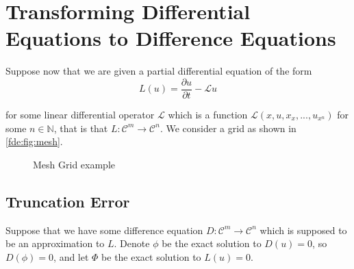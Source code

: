 \documentclass[../main.tex]{subfiles}
\begin{document}
  \section{Transforming Differential Equations to Difference Equations}
  Suppose now that we are given a partial differential equation of the form\\

  \begin{equation}
    L(u) = \frac{\partial u}{\partial t} - \mathcal{L}u
  \end{equation}

  for some linear differential operator $\mathcal{L}$ which is a function $\mathcal{L}(x, u, x_x, ..., u_{x^n})$ for some $n \in \mathbb{N}$, that is that $L :  \mathcal{C}^m \to \mathcal{C}^n$. We consider a grid as shown in \autoref{fde:fig:mesh}.

  \begin{figure}[b]
    \centering
    \caption{Mesh Grid example}\label{fde:fig:mesh}
  \end{figure}

  \subsection{Truncation Error}\label{sec:fdes:truncation}
  Suppose that we have some difference equation $D : \mathcal{C}^m \to \mathcal{C}^n$ which is supposed to be an approximation to $L$. Denote $\phi$ be the exact solution to $D(u) = 0$, so $D(\phi) = 0$, and let $\Phi$ be the exact solution to $L(u) = 0$.
\end{document}
